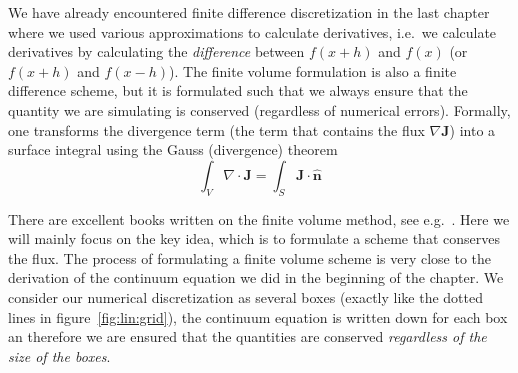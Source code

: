 \documentclass[graybox,sectrefs,envcountresetchap,open=right,final]{svmonodo}
\newenvironment{graybox2admon}[1][]{
\begin{graybox2mdframed}[frametitle=#1]
}
{
\end{graybox2mdframed}
}
\begin{document}
\noindent


\begin{graybox2admon}[Finite difference and finite volume]
We have already encountered finite difference discretization in the last chapter where we used various approximations to calculate derivatives, i.e.~we calculate derivatives by calculating the \emph{difference} between $f(x+h)$ and $f(x)$ (or $f(x+h)$ and $f(x-h)$). The finite volume formulation is also a finite difference scheme, but it is formulated such that we always ensure that the quantity we are simulating is conserved (regardless of numerical errors). Formally, one transforms the divergence term (the term that contains the flux $\nabla \mathbf{J}$) into a surface integral using the Gauss (divergence) theorem
\begin{equation}
\int_V\nabla\cdot \mathbf{J}=\int_S\mathbf{J}\cdot \hat{\mathbf{n}}
\label{eq:lin:dgau}
\end{equation}
\end{graybox2admon}



There are excellent books written on the finite volume method, see e.g.~\cite{leveque2002finite}. Here we will mainly focus on the key idea, which is to formulate a scheme that conserves the flux.
The process of formulating a finite volume scheme is very close to the derivation of the continuum equation we did in the beginning of the chapter. We consider our numerical discretization as several boxes (exactly like the dotted lines in figure~\ref{fig:lin:grid}), the continuum equation is written down for each box an therefore we are ensured that the quantities are conserved \emph{regardless of the size of the boxes}.
\end{document}
